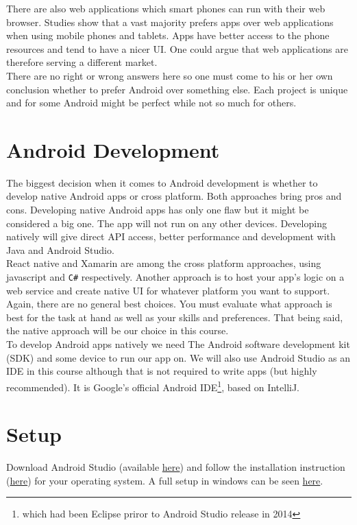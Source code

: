 There are also web applications which smart phones can run with their web browser. Studies show that a vast majority prefers apps over web applications when using mobile phones and tablets. Apps have better access to the phone resources and tend to have a nicer UI. One could argue that web applications are therefore serving a different market.\\

There are no right or wrong answers here so one must come to his or her own conclusion whether to prefer Android over something else. Each project is unique and for some Android might be perfect while not so much for others. 

\section{Android Development}
The biggest decision when it comes to Android development is whether to develop native Android apps or cross platform. Both approaches bring pros and cons. Developing native Android apps has only one flaw but it might be considered a big one. The app will not run on any other devices. Developing natively will give direct API access, better performance and development with Java and Android Studio.\\

React native and Xamarin are among the cross platform approaches, using javascript and \texttt{C\#} respectively. Another approach is to host your app's logic on a web service and create native UI for whatever platform you want to support. Again, there are no general best choices. You must evaluate what approach is best for the task at hand as well as your skills and preferences. That being said, the native approach will be our choice in this course.\\

To develop Android apps natively we need The Android software development kit (SDK) and some device to run our app on. We will also use Android Studio as an IDE in this course although that is not required to write apps (but highly recommended). It is Google's official Android IDE\footnote{which had been Eclipse priror to Android Studio release in 2014}, based on IntelliJ.

\section{Setup}
Download Android Studio (available \href{https://developer.android.com/studio/index.html}{here}) and follow the installation instruction (\href{https://developer.android.com/studio/install.html}{here}) for your operating system. A full setup in windows can be seen \href{https://www.youtube.com/watch?v=FH0UCP-JCqY}{here}.

